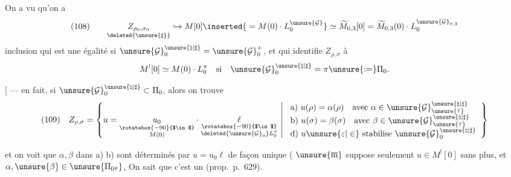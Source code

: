 
On a vu qu'on a
\[
(108)\qquad
\underset{\deleted{\unsure{\sharp}}}{Z_{\rho_0,\sigma_0}}
\hookrightarrow M[0]\inserted{{}=M(0)\cdot L_0^{\unsure{\mathcal G}}}
\simeq \widetilde M_{0,3}[0]
=\widetilde M_{0,3}(0)\cdot L_0^{\unsure{\mathcal G}_{0,3}}
\]
inclusion qui est une égalité si
$\unsure{\mathcal G}_0^{\unsure{\natural|\sharp}}=\unsure{\mathcal G}_0^+$,
et qui identifie $Z_{\rho,\sigma}$ à
\[
M^{!}[0]\simeq M(0)\cdot L_0^\pi
\quad\text{si}\quad
\unsure{\mathcal G}_0^{\unsure{\natural|\sharp}}=\pi\unsure{:=}\Pi_0.
\]

[ --- en fait, si
$\unsure{\mathcal G}_0^{\unsure{\natural|\sharp}}\subset\Pi_0$,
alors on trouve
\[
\begin{split}
(109)\quad Z_{\rho,\sigma}=\left\{
u=\underset{\substack{\rotatebox{-90}{$\in$}\\M(0)}}{u_0}\cdot
\underset{\substack{\rotatebox{-90}{$\in$}\\\deleted{\unsure{\mathcal G}_0}L_0^\pi}}{\ell}
\ \middle|\
\begin{array}{l}
\text{a) }u(\rho)=\alpha(\rho)\quad\text{avec }\alpha\in
\unsure{\mathcal G}_{\unsure{\bar\tau}}^{\unsure{\natural|\sharp}}\\
\text{b) }u(\sigma)=\beta(\sigma)\quad\text{avec }\beta\in
\unsure{\mathcal G}_{\unsure{\bar\tau}}^{\unsure{\natural|\sharp}}\\
\text{d) }u\unsure{\varepsilon|\in}\text{ stabilise }
\unsure{\mathcal G}_0^{\unsure{\natural|\sharp}}
\end{array}\right\}
\end{split}
\]

et on voit que $\alpha,\beta$ dans a) b) sont déterminés par
$u=u_0\ell$ de façon unique
( $\unsure{\overline{\mathrm m}}$
 suppose seulement $u\in M^{!}[0]$ sans plus,
et \inserted{\unsure{qu'on exige}}
$\alpha,\unsure{\beta}\in\unsure{\Pi_{0\bar\tau}}$,
On sait que c'est un 
(prop.\ p.\ $629$).

